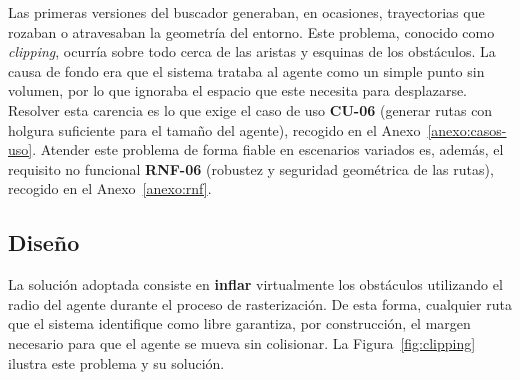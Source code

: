 Las primeras versiones del buscador generaban, en ocasiones, trayectorias que rozaban o atravesaban la geometría del entorno.
Este problema, conocido como \textit{clipping}, ocurría sobre todo cerca de las aristas y esquinas de los obstáculos.
La causa de fondo era que el sistema trataba al agente como un simple punto sin volumen, por lo que ignoraba el espacio que este necesita para desplazarse.
Resolver esta carencia es lo que exige el caso de uso \textbf{CU-06} (generar rutas con holgura suficiente para el tamaño del agente), recogido en el Anexo~\ref{anexo:casos-uso}.
Atender este problema de forma fiable en escenarios variados es, además, el requisito no funcional \textbf{RNF-06} (robustez y seguridad geométrica de las rutas), recogido en el Anexo~\ref{anexo:rnf}.

\subsection{Diseño}

La solución adoptada consiste en \textbf{inflar} virtualmente los obstáculos utilizando el radio del agente durante el proceso de rasterización.
De esta forma, cualquier ruta que el sistema identifique como libre garantiza, por construcción, el margen necesario para que el agente se mueva sin colisionar.
La Figura~\ref{fig:clipping} ilustra este problema y su solución.

